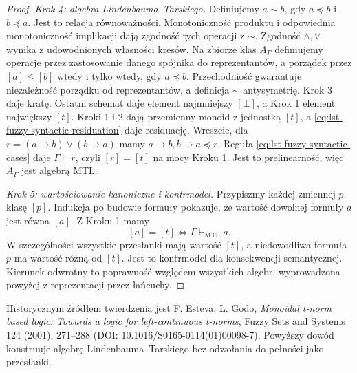 \begin{proof}
\emph{Krok 4: algebra Lindenbauma--Tarskiego.}
Definiujemy $a\sim b$, gdy $a\preccurlyeq b$ i
$b\preccurlyeq a$. Jest to relacja równoważności.
Monotoniczność produktu i odpowiednia monotoniczność
implikacji dają zgodność tych operacji z $\sim$.
Zgodność $\wedge,\vee$ wynika z udowodnionych własności
kresów. Na zbiorze klas $A_\Gamma$ definiujemy operacje
przez zastosowanie danego spójnika do reprezentantów,
a porządek przez $[a]\leq[b]$ wtedy i tylko wtedy,
gdy $a\preccurlyeq b$. Przechodniość gwarantuje niezależność
porządku od reprezentantów, a definicja $\sim$ antysymetrię.
Krok 3 daje kratę. Ostatni schemat daje element najmniejszy
$[\bot]$, a Krok 1 element największy $[t]$.
Kroki 1 i 2 dają przemienny monoid z jednostką $[t]$,
a \eqref{eq:lst-fuzzy-syntactic-residuation} daje residuację.
Wreszcie, dla $r=(a\to b)\vee(b\to a)$ mamy
$a\to b,b\to a\preccurlyeq r$. Reguła
\eqref{eq:lst-fuzzy-syntactic-cases} daje $\Gamma\vdash r$,
czyli $[r]=[t]$ na mocy Kroku 1. Jest to prelinearność,
więc $A_\Gamma$ jest algebrą MTL.

\emph{Krok 5: wartościowanie kanoniczne i kontrmodel.}
Przypiszmy każdej zmiennej $p$ klasę $[p]$. Indukcja
po budowie formuły pokazuje, że wartość dowolnej formuły
$a$ jest równa $[a]$. Z Kroku 1 mamy
\[
 [a]=[t]\iff\Gamma\vdash_{\mathrm{MTL}}a.
\]
W szczególności wszystkie przesłanki mają wartość $[t]$,
a niedowodliwa formuła $p$ ma wartość różną od $[t]$.
Jest to kontrmodel dla konsekwencji semantycznej.
Kierunek odwrotny to poprawność względem wszystkich algebr,
wyprowadzona powyżej z reprezentacji przez łańcuchy.
\end{proof}
Historycznym źródłem twierdzenia jest F. Esteva, L. Godo,
\emph{Monoidal t-norm based logic: Towards a logic for
left-continuous t-norms}, Fuzzy Sets and Systems 124 (2001),
271--288 (DOI: 10.1016/S0165-0114(01)00098-7).
Powyższy dowód konstruuje algebrę Lindenbauma--Tarskiego
bez odwołania do pełności jako przesłanki.

